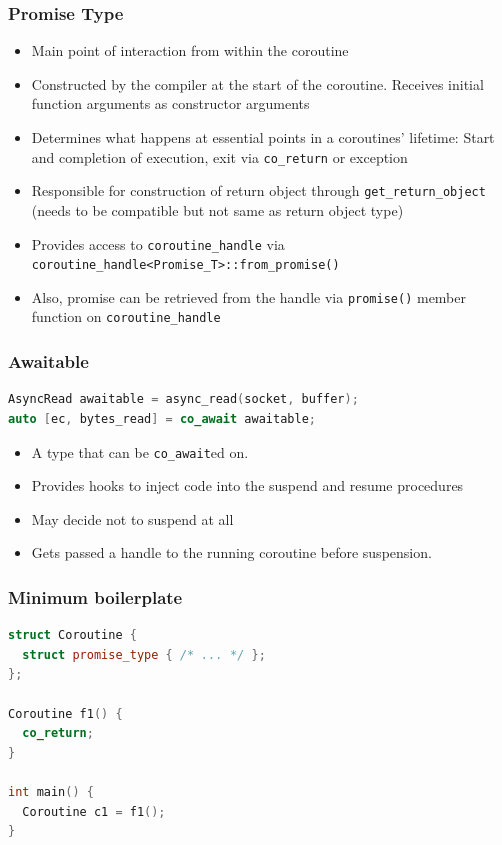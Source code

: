 \documentclass[aspectratio=169]{beamer}
\newif\iftransitions
\begin{document}
\begin{frame}[fragile]
  \frametitle{Promise Type}

  \begin{itemize}
    \item Main point of interaction from within the coroutine  \iftransitions \pause \fi
    \item Constructed by the compiler at the start of the coroutine. Receives initial function arguments as constructor arguments \iftransitions \pause \fi
    \item Determines what happens at essential points in a coroutines' lifetime: Start and completion of execution, exit via \texttt{co\_return} or exception \iftransitions \pause \fi
    \item Responsible for construction of return object through \texttt{get\_return\_object} (needs to be compatible but not same as return object type) \iftransitions \pause \fi
    \item Provides access to \texttt{coroutine\_handle} via \texttt{coroutine\_handle<Promise\_T>::from\_promise()} \iftransitions \pause \fi
    \item Also, promise can be retrieved from the handle via \texttt{promise()} member function on \texttt{coroutine\_handle}
  \end{itemize}
\end{frame}

\begin{frame}[fragile]
  \frametitle{Awaitable}
  
  \begin{lstlisting}[language={C++}]
AsyncRead awaitable = async_read(socket, buffer);
auto [ec, bytes_read] = co_await awaitable;
  \end{lstlisting}

  
  \begin{itemize}
  \item A type that can be \texttt{co\_await}ed on.  \iftransitions \pause \fi
  \item Provides hooks to inject code into the suspend and resume procedures  \iftransitions \pause \fi
  \item May decide not to suspend at all \iftransitions \pause \fi
  \item Gets passed a handle to the running coroutine before suspension.
  \end{itemize}
\end{frame}

\begin{frame}[fragile]
  \frametitle{Minimum boilerplate}
  
  \begin{lstlisting}[language={C++}]
struct Coroutine {
  struct promise_type { /* ... */ };
};

Coroutine f1() {
  co_return;
}

int main() {
  Coroutine c1 = f1();
}
  \end{lstlisting}
\end{frame}
\end{document}

